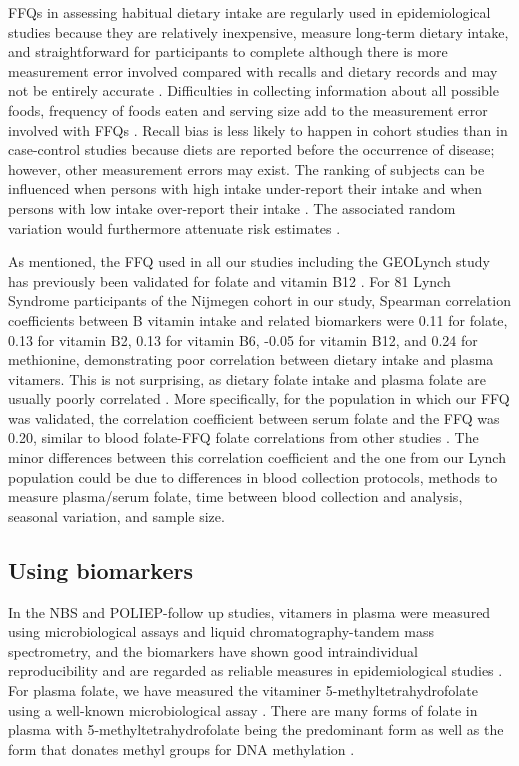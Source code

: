 \noindent FFQs in assessing habitual dietary intake are regularly used in epidemiological studies because they are relatively inexpensive, measure long-term dietary intake, and straightforward for participants to complete \cite{c724} although there is more measurement error involved compared with recalls and dietary records and may not be entirely accurate \cite{c725,c726}. Difficulties in collecting information about all possible foods, frequency of foods eaten and serving size add to the measurement error involved with FFQs \cite{c727}. Recall bias is less likely to happen in cohort studies than in case-control studies because diets are reported before the occurrence of disease; however, other measurement errors may exist. The ranking of subjects can be influenced when persons with high intake under-report their intake and when persons with low intake over-report their intake \cite{c728}. The associated random variation would furthermore attenuate risk estimates \cite{c729}. 
 
\noindent As mentioned, the FFQ used in all our studies including the GEOLynch study has previously been validated for folate and vitamin B12 \cite{c717}. For 81 Lynch Syndrome participants of the Nijmegen cohort in our study, Spearman correlation coefficients between B vitamin intake and related biomarkers were 0.11 for folate, 0.13 for vitamin B2, 0.13 for vitamin B6, -0.05 for vitamin B12, and 0.24 for methionine, demonstrating poor correlation between dietary intake and plasma vitamers. This is not surprising, as dietary folate intake and plasma folate are usually poorly correlated \cite{c722,c730,c731}. More specifically, for the population in which our FFQ was validated, the correlation coefficient between serum folate and the FFQ was 0.20, similar to blood folate-FFQ folate correlations from other studies \cite{c722,c730,c731}. The minor differences between this correlation coefficient and the one from our Lynch population could be due to differences in blood collection protocols, methods to measure 
plasma/serum folate, time between blood collection and analysis, seasonal variation, and sample size. 
 
\subsection{Using biomarkers} %
In the NBS and POLIEP-follow up studies, vitamers in plasma were measured using microbiological assays and liquid chromatography-tandem mass spectrometry, and the biomarkers have shown good intraindividual reproducibility and are regarded as reliable measures in epidemiological studies \cite{c732}. For plasma folate, we have measured the vitaminer 5-methyltetrahydrofolate using a well-known microbiological assay \cite{c733}. There are many forms of folate in plasma with 5-methyltetrahydrofolate being the predominant form as well as the form that donates methyl groups for DNA methylation \cite{c734}. 
 

